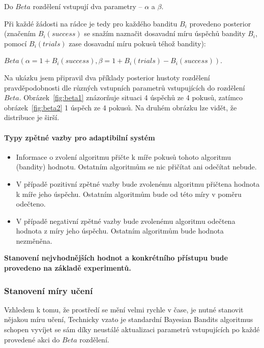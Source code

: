 \documentclass[thesis=M,czech]{FITthesis}[2014/05/07]
\begin{document}
Do ${Beta}$ rozdělení vstupují dva parametry – $\alpha$ a $\beta$.

Při každé žádosti na rádce je tedy pro každého banditu $B_i$ provedeno posterior (značením $B_i(success)$ se snažím naznačit dosavadní míru úspěchů bandity $B_i$, pomocí $B_i(trials)$ zase dosavadní míru pokusů téhož bandity):

\begin{center}
${Beta}(\alpha = 1 + B_i(success), \beta = 1 + B_i(trials) - B_i(success))$.
\end{center}

Na ukázku jsem připravil dva příklady posterior hustoty rozdělení pravděpodobnosti dle různých vstupních parametrů vstupujících do rozdělení ${Beta}$. Obrázek~\ref{fig:beta1} znázorňuje situaci 4 úspěchů ze 4 pokusů, zatímco obrázek~\ref{fig:beta2} 1 úspěch ze 4 pokusů. Na druhém obrázku lze vidět, že distribuce je širší.

\paragraph{Typy zpětné vazby pro adaptibilní systém}

\begin{itemize}
	\item Informace o zvolení algoritmu přičte k míře pokusů tohoto algoritmu (bandity) hodnotu. Ostatním algoritmům se nic přičítat ani odečítat nebude.
	\item V případě pozitivní zpětné vazby bude zvolenému algoritmu přičtena hodnota k míře jeho úspěchu. Ostatním algoritmům bude od této míry v poměru odečteno.
	\item V případě negativní zpětné vazby bude zvolenému algoritmu odečtena hodnota z míry jeho úspěchu. Ostatním algoritmům bude hodnota nezměněna.
\end{itemize}

\textbf{Stanovení nejvhodnějších hodnot a konkrétního přístupu bude provedeno na základě experimentů.}

\subsubsection{Stanovení míry učení}
\label{rate}
Vzhledem k tomu, že prostředí se mění velmi rychle v čase, je nutné stanovit nějakou míru učení, Technicky vzato je standardní Bayesian Bandits algoritmus schopen vyvíjet se sám díky neustálé aktualizaci parametrů vstupujících po každé provedené akci do ${Beta}$ rozdělení.
\end{document}
